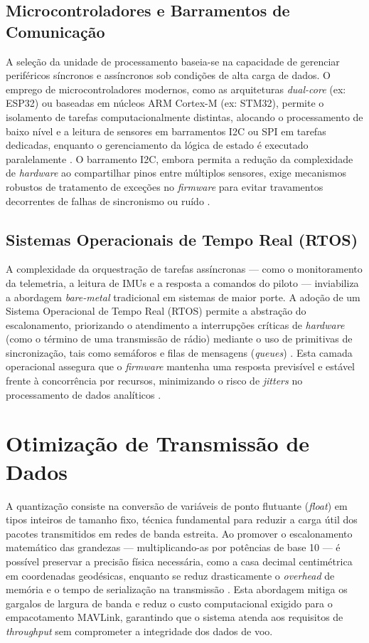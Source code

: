 \subsection{Microcontroladores e Barramentos de Comunicação}

A seleção da unidade de processamento baseia-se na capacidade de gerenciar periféricos síncronos e assíncronos sob condições de alta carga de dados. O emprego de microcontroladores modernos, como as arquiteturas \textit{dual-core} (ex: ESP32) ou baseadas em núcleos ARM Cortex-M (ex: STM32), permite o isolamento de tarefas computacionalmente distintas, alocando o processamento de baixo nível e a leitura de sensores em barramentos I2C ou SPI em tarefas dedicadas, enquanto o gerenciamento da lógica de estado é executado paralelamente \cite{white_embedded_systems}. O barramento I2C, embora permita a redução da complexidade de \textit{hardware} ao compartilhar pinos entre múltiplos sensores, exige mecanismos robustos de tratamento de exceções no \textit{firmware} para evitar travamentos decorrentes de falhas de sincronismo ou ruído \cite{STM32F405RG_datasheet}.

\subsection{Sistemas Operacionais de Tempo Real (RTOS)}

A complexidade da orquestração de tarefas assíncronas — como o monitoramento da telemetria, a leitura de IMUs e a resposta a comandos do piloto — inviabiliza a abordagem \textit{bare-metal} tradicional em sistemas de maior porte. A adoção de um Sistema Operacional de Tempo Real (RTOS) permite a abstração do escalonamento, priorizando o atendimento a interrupções críticas de \textit{hardware} (como o término de uma transmissão de rádio) mediante o uso de primitivas de sincronização, tais como semáforos e filas de mensagens (\textit{queues}) \cite{barry_freertos}. Esta camada operacional assegura que o \textit{firmware} mantenha uma resposta previsível e estável frente à concorrência por recursos, minimizando o risco de \textit{jitters} no processamento de dados analíticos \cite{barry_freertos}.

\section{Otimização de Transmissão de Dados}

A quantização consiste na conversão de variáveis de ponto flutuante (\textit{float}) em tipos inteiros de tamanho fixo, técnica fundamental para reduzir a carga útil dos pacotes transmitidos em redes de banda estreita. Ao promover o escalonamento matemático das grandezas — multiplicando-as por potências de base 10 — é possível preservar a precisão física necessária, como a casa decimal centimétrica em coordenadas geodésicas, enquanto se reduz drasticamente o \textit{overhead} de memória e o tempo de serialização na transmissão \cite{oppenheim_signal_processing}. Esta abordagem mitiga os gargalos de largura de banda e reduz o custo computacional exigido para o empacotamento MAVLink, garantindo que o sistema atenda aos requisitos de \textit{throughput} sem comprometer a integridade dos dados de voo.

